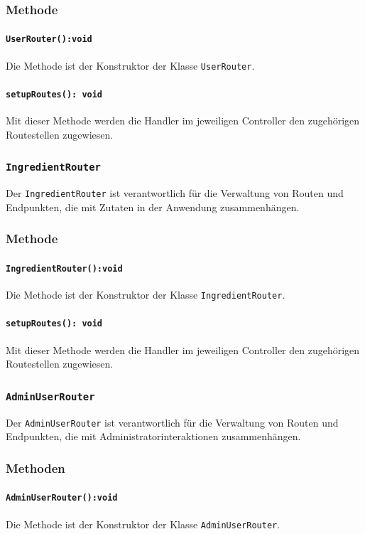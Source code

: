 \documentclass{entwurfsheft}
\begin{document}
\begin{sloppypar}
\subsubsection*{Methode}
\paragraph{\texttt{UserRouter():void}}
Die Methode ist der Konstruktor der Klasse \texttt{UserRouter}.
\paragraph{\texttt{setupRoutes(): void}}
Mit dieser Methode werden die Handler im jeweiligen Controller den zugehörigen Routestellen zugewiesen.

\subsubsection{\texttt{IngredientRouter}}\label{sec:IngredientRouter}
Der \texttt{IngredientRouter} ist verantwortlich für die Verwaltung von Routen und Endpunkten, die mit Zutaten in der Anwendung zusammenhängen.
\subsubsection*{Methode}
\paragraph{\texttt{IngredientRouter():void}}
Die Methode ist der Konstruktor der Klasse \texttt{IngredientRouter}.
\paragraph{\texttt{setupRoutes(): void}}
Mit dieser Methode werden die Handler im jeweiligen Controller den zugehörigen Routestellen zugewiesen.

\subsubsection{\texttt{AdminUserRouter}}\label{sec:AdminUserRouter}
Der \texttt{AdminUserRouter} ist verantwortlich für die Verwaltung von Routen und Endpunkten, die mit Administratorinteraktionen zusammenhängen.
\subsubsection*{Methoden}
\paragraph{\texttt{AdminUserRouter():void}}
Die Methode ist der Konstruktor der Klasse \texttt{AdminUserRouter}.

\end{sloppypar}
\end{document}
